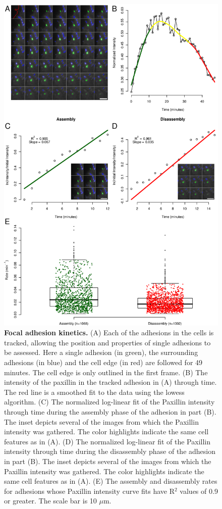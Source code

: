 \begin{figure}[htbp]
\begin{center}
\includegraphics[height=0.8\textheight]{../figures/kinetics/kinetics}
\end{center}
\caption{
{\bf Focal adhesion kinetics.} (A) Each of the adhesions in the cells is tracked, allowing the position and properties of single adhesions to be assessed. Here a single adhesion (in green), the surrounding adhesions (in blue) and the cell edge (in red) are followed for 49 minutes. The cell edge is only outlined in the first frame. (B) The intensity of the paxillin in the tracked adhesion in (A) through time. The red line is a smoothed fit to the data using the lowess algorithm. (C) The normalized log-linear fit of the Paxillin intensity through time during the assembly phase of the adhesion in part (B). The inset depicts several of the images from which the Paxillin intensity was gathered. The color highlights indicate the same cell features as in (A). (D) The normalized log-linear fit of the Paxillin intensity through time during the disassembly phase of the adhesion in part (B). The inset depicts several of the images from which the Paxillin intensity was gathered. The color highlights indicate the same cell features as in (A). (E) The assembly and disassembly rates for adhesions whose Paxillin intensity curve fits have R$^2$ values of 0.9 or greater. The scale bar is 10 $\mu$m.
}
\label{kinetics}
\end{figure}

